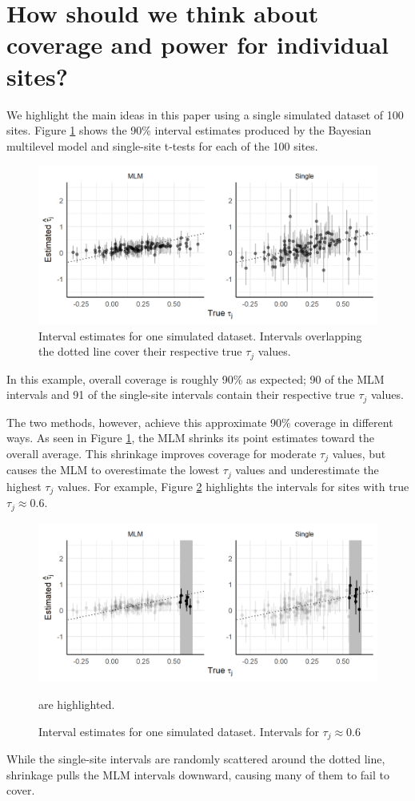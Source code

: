 \documentclass[]{article}
\begin{document}
\section{How should we think about coverage and power for individual sites?}

We highlight the main ideas in this paper using a single simulated dataset of 100 sites.
Figure \ref{fig:shrinkageplot} shows the 90\% interval estimates produced by the Bayesian multilevel model and single-site t-tests for each of the 100 sites.
\begin{figure}[ht]
	\centering
	\includegraphics[width=\textwidth]{shrinkageplot}
	\caption{Interval estimates for one simulated dataset. Intervals overlapping the dotted line cover their respective true $\tau_j$ values.}
	\label{fig:shrinkageplot}
\end{figure}
In this example, overall coverage is roughly 90\% as expected; 90 of the MLM intervals and 91 of the single-site intervals contain their respective true $\tau_j$ values.

The two methods, however, achieve this approximate 90\% coverage in different ways.
As seen in Figure \ref{fig:shrinkageplot}, the MLM shrinks its point estimates toward the overall average.
This shrinkage improves coverage for moderate $\tau_j$ values, but causes the MLM to overestimate the lowest $\tau_j$ values and underestimate the highest $\tau_j$ values.
For example, Figure \ref{fig:shrinkageplot_slice1} highlights the intervals for sites with true $\tau_j \approx 0.6$.
\begin{figure}[ht]
	\centering
	\includegraphics[width=\textwidth]{shrinkageplot_slice1}
	\caption{Interval estimates for one simulated dataset. Intervals for $\tau_j \approx 0.6$} are highlighted.
	\label{fig:shrinkageplot_slice1}
\end{figure}
While the single-site intervals are randomly scattered around the dotted line, shrinkage pulls the MLM intervals downward, causing many of them to fail to cover.
\end{document}
